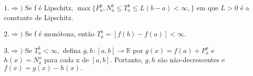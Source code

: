 \documentclass[analysis_notes.tex]{subfiles}
\begin{document}
\begin{proof*}
	\(1. \Rightarrow )\) Se f é Lipschitz, \(\max\{P_{a}^{b}, N_{a}^{b}\leq T_{a}^{b}\leq L(b-a) < \infty,\}\)
	em que \(L > 0\) é a constante de Lipschitz.

	\(2. \Rightarrow )\) Se f é monótona, então \(T_{a}^{b} = [f(b)-f(a)] < \infty.\)

	\(3. \Rightarrow )\) Se \(T_{a}^{b} < \infty,\) defina \(g, h:[a, b]\rightarrow \mathbb{R}\) por
	\(g(x) = f(a) + P_{a}^{x}\) e \(h(x) = N_{a}^{x}\) para cada x de \([a, b]\). Portanto,
	\(g, h\) são não-decrescentes e \(f(x) = g(x) - h(x).\) \qedsymbol
\end{proof*}
\end{document}
